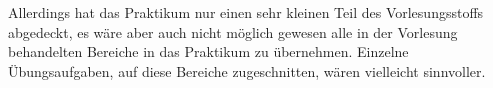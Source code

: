 Allerdings hat das Praktikum nur einen sehr kleinen Teil des Vorlesungsstoffs abgedeckt, es wäre aber auch nicht möglich gewesen alle in der Vorlesung behandelten Bereiche in das Praktikum zu übernehmen. Einzelne Übungsaufgaben, auf diese Bereiche zugeschnitten, wären vielleicht sinnvoller.





